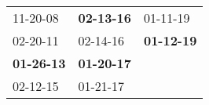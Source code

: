 \begin{supertabular}{p{0.33\columnwidth}p{0.33\columnwidth}p{0.33\columnwidth}}
          11-20-08\textsuperscript{} &  \textbf{02-13-16\textsuperscript{}} &           01-11-19\textsuperscript{} \\
          02-20-11\textsuperscript{} &           02-14-16\textsuperscript{} &  \textbf{01-12-19\textsuperscript{}} \\
 \textbf{01-26-13\textsuperscript{}} &  \textbf{01-20-17\textsuperscript{}} &                                      \\
          02-12-15\textsuperscript{} &           01-21-17\textsuperscript{} &                                      \\
\end{supertabular}

